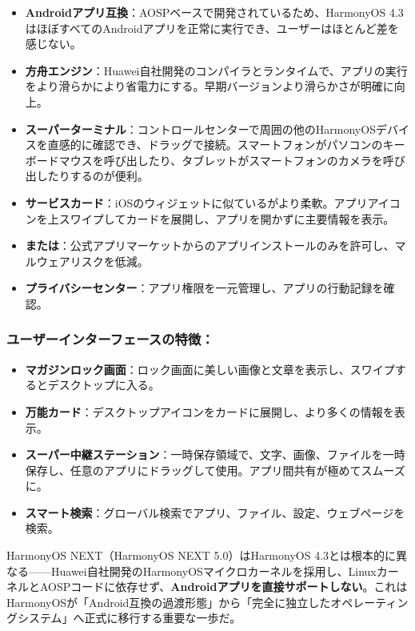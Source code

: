 \begin{itemize}
  \item \textbf{Androidアプリ互換}：AOSPベースで開発されているため、HarmonyOS 4.3はほぼすべてのAndroidアプリを正常に実行でき、ユーザーはほとんど差を感じない。
  \item \textbf{方舟エンジン}：Huawei自社開発のコンパイラとランタイムで、アプリの実行をより滑らかにより省電力にする。早期バージョンより滑らかさが明確に向上。
  \item \textbf{スーパーターミナル}：コントロールセンターで周囲の他のHarmonyOSデバイスを直感的に確認でき、ドラッグで接続。スマートフォンがパソコンのキーボードマウスを呼び出したり、タブレットがスマートフォンのカメラを呼び出したりするのが便利。
  \item \textbf{サービスカード}：iOSのウィジェットに似ているがより柔軟。アプリアイコンを上スワイプしてカードを展開し、アプリを開かずに主要情報を表示。
  \item \textbf{または}：公式アプリマーケットからのアプリインストールのみを許可し、マルウェアリスクを低減。
  \item \textbf{プライバシーセンター}：アプリ権限を一元管理し、アプリの行動記録を確認。
\end{itemize}

\subsubsection*{ユーザーインターフェースの特徴：}

\begin{itemize}
  \item \textbf{マガジンロック画面}：ロック画面に美しい画像と文章を表示し、スワイプするとデスクトップに入る。
  \item \textbf{万能カード}：デスクトップアイコンをカードに展開し、より多くの情報を表示。
  \item \textbf{スーパー中継ステーション}：一時保存領域で、文字、画像、ファイルを一時保存し、任意のアプリにドラッグして使用。アプリ間共有が極めてスムーズに。
  \item \textbf{スマート検索}：グローバル検索でアプリ、ファイル、設定、ウェブページを検索。
\end{itemize}


HarmonyOS NEXT（HarmonyOS NEXT 5.0）はHarmonyOS 4.3とは根本的に異なる——Huawei自社開発のHarmonyOSマイクロカーネルを採用し、LinuxカーネルとAOSPコードに依存せず、\textbf{Androidアプリを直接サポートしない}。これはHarmonyOSが「Android互換の過渡形態」から「完全に独立したオペレーティングシステム」へ正式に移行する重要な一歩だ。

